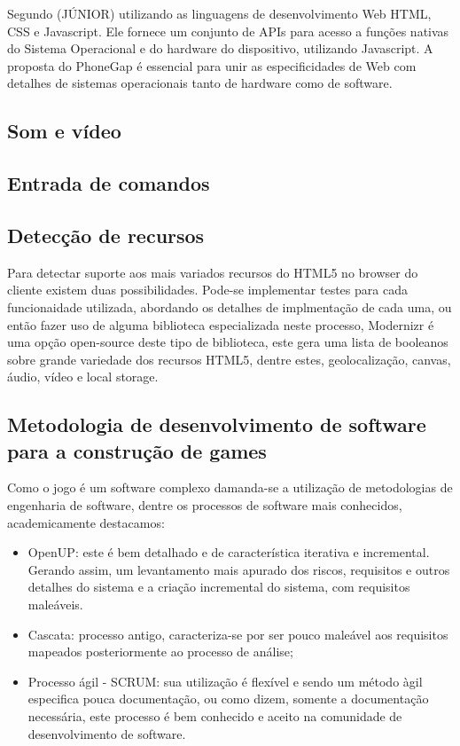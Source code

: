 \documentclass{article}
\begin{document}
Segundo (JÚNIOR) utilizando as linguagens de desenvolvimento Web HTML, CSS e Javascript. Ele fornece um conjunto de APIs para acesso a funções nativas do Sistema Operacional e do hardware do dispositivo, utilizando Javascript. A proposta do PhoneGap é essencial para unir as especificidades de Web com detalhes de sistemas operacionais tanto de hardware como de software. 

\subsection{Som e vídeo}

\subsection{Entrada de comandos}

\subsection{Detecção de recursos}

Para detectar suporte aos mais variados recursos do HTML5 no browser do cliente existem duas possibilidades. Pode-se implementar testes para cada funcionaidade utilizada, abordando os detalhes de implmentação de cada uma, ou então fazer uso de alguma biblioteca especializada neste processo, Modernizr é uma opção open-source deste tipo de biblioteca, este gera uma lista de booleanos sobre grande variedade dos recursos HTML5, dentre estes, geolocalização, canvas, áudio, vídeo e local storage.

\subsection{Metodologia de desenvolvimento de software para a construção de games}

Como o jogo é um software complexo damanda-se a utilização de metodologias de engenharia de software, dentre os processos de software mais conhecidos, academicamente destacamos: 


\begin{itemize}
\item OpenUP: este é bem detalhado e de característica iterativa e incremental. Gerando assim, um levantamento mais apurado dos riscos, requisitos e outros detalhes do sistema e a criação incremental do sistema, com requisitos maleáveis.
\item Cascata: processo antigo, caracteriza-se por ser pouco maleável aos requisitos mapeados posteriormente ao processo de análise;
\item Processo ágil - SCRUM: sua utilização é flexível e sendo um método àgil especifica pouca documentação, ou como dizem, somente a documentação necessária, este processo é bem conhecido e aceito na comunidade de desenvolvimento de software.
\end{itemize}
\end{document}
